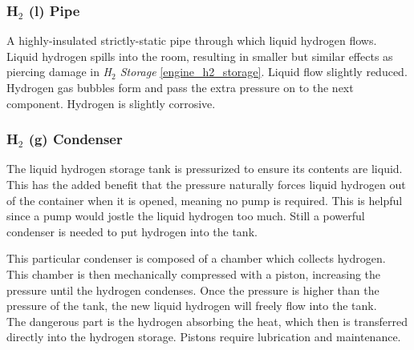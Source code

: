 \documentclass[a4paper]{article}
\begin{document}
\vspace{-0.5cm} \hspace{-18pt} \subsubsection{H$_2$ (l) Pipe} \label{engine_h2_pipe} \vspace{-0.2cm}
A highly-insulated strictly-static pipe through which liquid hydrogen flows.
\\ \pbhw
{Liquid hydrogen spills into the room, resulting in smaller but similar effects as piercing damage in \textit{H$_2$ Storage} \ref{engine_h2_storage}.}
{Liquid flow slightly reduced.}
{Hydrogen gas bubbles form and pass the extra pressure on to the next component.}
{Hydrogen is slightly corrosive.}


\vspace{-0.5cm} \hspace{-18pt} \subsubsection{H$_2$ (g) Condenser} \label{engine_h2_condenser} \vspace{-0.2cm}
The liquid hydrogen storage tank is pressurized to ensure its contents are liquid. This has the added benefit that the pressure naturally forces liquid hydrogen out of the container when it is opened, meaning no pump is required. This is helpful since a pump would jostle the liquid hydrogen too much. Still a powerful condenser is needed to put hydrogen into the tank. 

This particular condenser is composed of a chamber which collects hydrogen. This chamber is then mechanically compressed with a piston, increasing the pressure until the hydrogen condenses. Once the pressure is higher than the pressure of the tank, the new liquid hydrogen will freely flow into the tank.
\\ \pbhw
{}
{}
{The dangerous part is the hydrogen absorbing the heat, which then is transferred directly into the hydrogen storage.}
{Pistons require lubrication and maintenance.}
\end{document}

